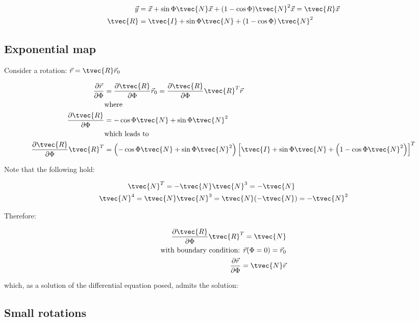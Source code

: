 \documentclass[10pt,a4paper]{scrartcl}
\begin{document}
\begin{multicols*}{2}

\begin{align*}
\vec{y}&=\vec{x}+\sin\Phi\tvec{N}\vec{x}+(1-\cos\Phi)\tvec{N}^2\vec{x}=\tvec{R}\vec{x}\\
\tvec{R}&=\tvec{I}+\sin\Phi\tvec{N}+\left(1-\cos\Phi\right)\tvec{N}^2
\end{align*}

\subsection{Exponential map}

Consider a rotation: $\vec{r}=\tvec{R}\vec{r}_0$

\begin{align*}
\frac{\partial\vec{r}}{\partial \Phi}&=\frac{\partial\tvec{R}}{\partial \Phi}\vec{r}_0=\frac{\partial\tvec{R}}{\partial\Phi}\tvec{R}^T\vec{r}\\
&\text{where}\\
\frac{\partial\tvec{R}}{\partial\Phi}&=-\cos\Phi\tvec{N}+\sin\Phi\tvec{N}^2\\
&\text{which leads to}\\
\frac{\partial\tvec{R}}{\partial\Phi}\tvec{R}^T&=\left(-\cos\Phi\tvec{N}+\sin\Phi\tvec{N}^2\right)\left[\tvec{I}+\sin\Phi\tvec{N}+\left(1-\cos\Phi\tvec{N}^2\right)\right]^T
\end{align*}

Note that the following hold:

\begin{align*}
\tvec{N}^T=-\tvec{N}&\tvec{N}^3=-\tvec{N}\\
\tvec{N}^4=\tvec{N}\tvec{N}^3&=\tvec{N}(-\tvec{N})=-\tvec{N}^2
\end{align*}

Therefore:

\begin{align*}
\frac{\partial\tvec{R}}{\partial\Phi}\tvec{R}^T=\tvec{N}\\
\text{with boundary condition: } \vec{r}(\Phi = 0)=\vec{r}_0\\
\frac{\partial\vec{r}}{\partial\Phi}=\tvec{N}\vec{r}
\end{align*}

which, as a solution of the differential equation posed, admits the solution:


\subsection{Small rotations}


\end{multicols*}
\end{document}
